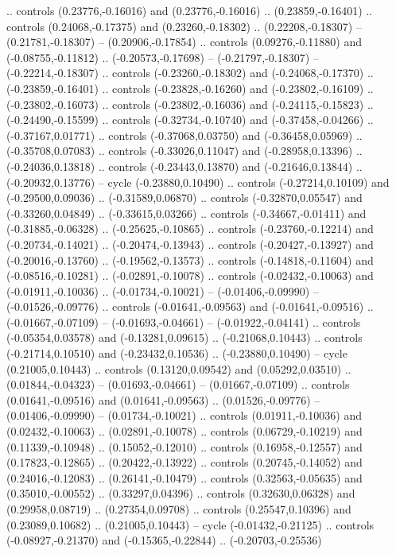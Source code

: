 {{.. controls (0.23776,-0.16016) and (0.23776,-0.16016) .. (0.23859,-0.16401)
.. controls (0.24068,-0.17375) and (0.23260,-0.18302) .. (0.22208,-0.18307)
-- (0.21781,-0.18307)
-- (0.20906,-0.17854)
.. controls (0.09276,-0.11880) and (-0.08755,-0.11812) .. (-0.20573,-0.17698)
-- (-0.21797,-0.18307)
-- (-0.22214,-0.18307)
.. controls (-0.23260,-0.18302) and (-0.24068,-0.17370) .. (-0.23859,-0.16401)
.. controls (-0.23828,-0.16260) and (-0.23802,-0.16109) .. (-0.23802,-0.16073)
.. controls (-0.23802,-0.16036) and (-0.24115,-0.15823) .. (-0.24490,-0.15599)
.. controls (-0.32734,-0.10740) and (-0.37458,-0.04266) .. (-0.37167,0.01771)
.. controls (-0.37068,0.03750) and (-0.36458,0.05969) .. (-0.35708,0.07083)
.. controls (-0.33026,0.11047) and (-0.28958,0.13396) .. (-0.24036,0.13818)
.. controls (-0.23443,0.13870) and (-0.21646,0.13844) .. (-0.20932,0.13776)
-- cycle
(-0.23880,0.10490)
.. controls (-0.27214,0.10109) and (-0.29500,0.09036) .. (-0.31589,0.06870)
.. controls (-0.32870,0.05547) and (-0.33260,0.04849) .. (-0.33615,0.03266)
.. controls (-0.34667,-0.01411) and (-0.31885,-0.06328) .. (-0.25625,-0.10865)
.. controls (-0.23760,-0.12214) and (-0.20734,-0.14021) .. (-0.20474,-0.13943)
.. controls (-0.20427,-0.13927) and (-0.20016,-0.13760) .. (-0.19562,-0.13573)
.. controls (-0.14818,-0.11604) and (-0.08516,-0.10281) .. (-0.02891,-0.10078)
.. controls (-0.02432,-0.10063) and (-0.01911,-0.10036) .. (-0.01734,-0.10021)
-- (-0.01406,-0.09990)
-- (-0.01526,-0.09776)
.. controls (-0.01641,-0.09563) and (-0.01641,-0.09516) .. (-0.01667,-0.07109)
-- (-0.01693,-0.04661)
-- (-0.01922,-0.04141)
.. controls (-0.05354,0.03578) and (-0.13281,0.09615) .. (-0.21068,0.10443)
.. controls (-0.21714,0.10510) and (-0.23432,0.10536) .. (-0.23880,0.10490)
-- cycle
(0.21005,0.10443)
.. controls (0.13120,0.09542) and (0.05292,0.03510) .. (0.01844,-0.04323)
-- (0.01693,-0.04661)
-- (0.01667,-0.07109)
.. controls (0.01641,-0.09516) and (0.01641,-0.09563) .. (0.01526,-0.09776)
-- (0.01406,-0.09990)
-- (0.01734,-0.10021)
.. controls (0.01911,-0.10036) and (0.02432,-0.10063) .. (0.02891,-0.10078)
.. controls (0.06729,-0.10219) and (0.11339,-0.10948) .. (0.15052,-0.12010)
.. controls (0.16958,-0.12557) and (0.17823,-0.12865) .. (0.20422,-0.13922)
.. controls (0.20745,-0.14052) and (0.24016,-0.12083) .. (0.26141,-0.10479)
.. controls (0.32563,-0.05635) and (0.35010,-0.00552) .. (0.33297,0.04396)
.. controls (0.32630,0.06328) and (0.29958,0.08719) .. (0.27354,0.09708)
.. controls (0.25547,0.10396) and (0.23089,0.10682) .. (0.21005,0.10443)
-- cycle
(-0.01432,-0.21125)
.. controls (-0.08927,-0.21370) and (-0.15365,-0.22844) .. (-0.20703,-0.25536)
}}
